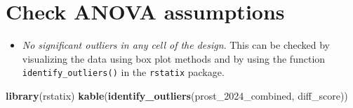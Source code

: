 \documentclass[
  10pt,
]{article}
\newenvironment{Shaded}{\begin{snugshade}}{\end{snugshade}}
\newcommand{\FunctionTok}[1]{\textcolor[rgb]{0.13,0.29,0.53}{\textbf{#1}}}
\newcommand{\NormalTok}[1]{#1}
\providecommand{\tightlist}{%
  \setlength{\itemsep}{0pt}\setlength{\parskip}{0pt}}
\begin{document}
\section{Check ANOVA assumptions}\label{check-anova-assumptions}

\begin{itemize}
\tightlist
\item
  \emph{No significant outliers in any cell of the design}. This can be
  checked by visualizing the data using box plot methods and by using
  the function \texttt{identify\_outliers()} in the \texttt{rstatix}
  package.
\end{itemize}

\begin{Shaded}
\begin{Highlighting}[]
\FunctionTok{library}\NormalTok{(rstatix)}
\FunctionTok{kable}\NormalTok{(}\FunctionTok{identify\_outliers}\NormalTok{(prost\_2024\_combined, diff\_score))}
\end{Highlighting}
\end{Shaded}
\end{document}
